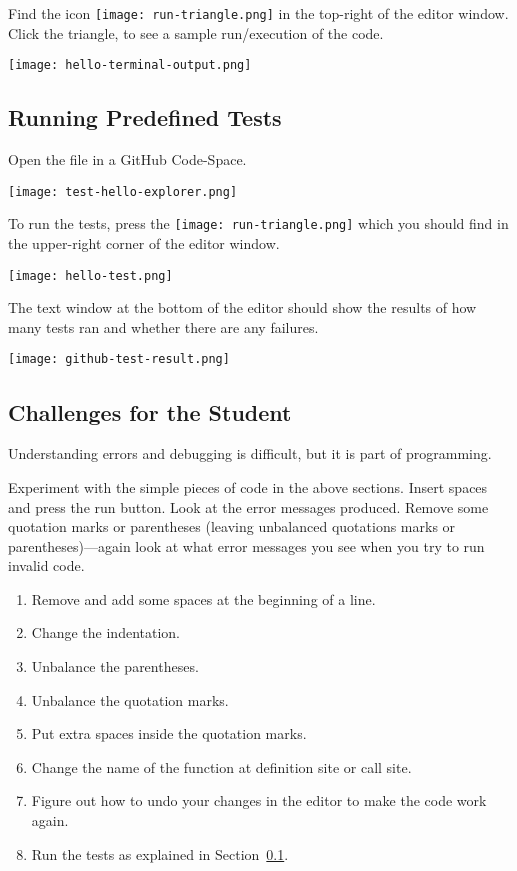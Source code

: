 Find the icon \texttt{[image: run-triangle.png]} in the
top-right of the editor window.  Click the triangle, to see a sample
run/execution of the code.

\noindent\texttt{[image: hello-terminal-output.png]}


\subsection{Running Predefined Tests}
\label{sec.run.tests}

Open the file  in a GitHub Code-Space.

\noindent\texttt{[image: test-hello-explorer.png]}

To run the tests, press the
\texttt{[image: run-triangle.png]} which you should find in
the upper-right corner of the editor window.

\noindent\texttt{[image: hello-test.png]}


The text window at the bottom of the editor should show the results of
how many tests ran and whether there are any failures.

\noindent\texttt{[image: github-test-result.png]}



\subsection{Challenges for the Student}

Understanding errors and debugging is difficult, but it is part of
programming.

Experiment with the simple pieces of code in the above sections.
Insert spaces and press the run button.  Look at the error messages
produced. Remove some quotation marks or parentheses (leaving
unbalanced quotations marks or parentheses)---again look at what error
messages you see when you try to run invalid code.


\begin{enumerate}
\item Remove and add some spaces at the beginning of a line.
\item Change the indentation.
\item Unbalance the parentheses.
\item Unbalance the quotation marks.
\item Put extra spaces inside the quotation marks.
\item Change the name of the  function at definition site
  or call site.
\item Figure out how to undo your changes in the editor to make the
  code work again.
\item Run the tests  as explained in
  Section~\ref{sec.run.tests}.
\end{enumerate}

\clearpage

